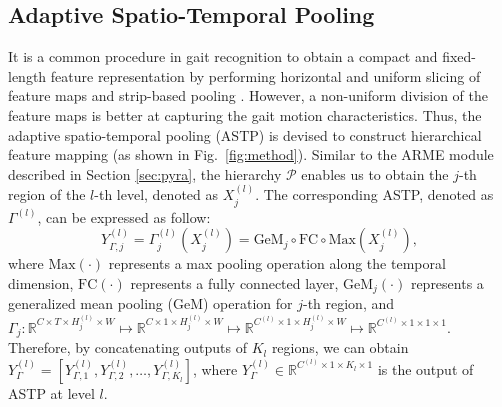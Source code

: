 \documentclass[10pt,twocolumn,letterpaper]{article}
\begin{document}
\subsection{Adaptive Spatio-Temporal  Pooling}
\label{sec:astp}

It is a common procedure in gait recognition to obtain a compact and fixed-length feature representation by performing horizontal and uniform slicing of feature maps and strip-based pooling \cite{chao2019gaitset,fu2019horizontal,lin2020gait,lin2021gait,huang2021context}. However, a non-uniform division of the feature maps is better at capturing the gait motion characteristics. Thus, the adaptive spatio-temporal pooling (ASTP) is devised to construct hierarchical feature mapping (as shown in Fig.~\ref{fig:method}). Similar to the ARME module described in Section \ref{sec:pyra}, the hierarchy $\mathcal{P}$ enables us to obtain the $j$-th region of the $l$-th level, denoted as $X_j^{(l)}$. The corresponding ASTP, denoted as $\Gamma^{(l)}$, can be expressed as follow:
\begin{equation}
Y_{\Gamma,j}^{(l)}=\Gamma_j^{(l)}(X_j^{(l)})=\text{GeM}_j \circ \text{FC} \circ \text{Max}(X_j^{(l)}),
\end{equation}
where $\text{Max}(\cdot)$ represents a max pooling operation along the temporal dimension, $\text{FC}(\cdot)$ represents a fully connected layer, $\text{GeM}_j(\cdot)$ represents a generalized mean pooling (GeM) operation \cite{radenovic2018fine} for $j$-th region, and $\Gamma_j:\mathbb{R}^{C \times T \times H_j^{(l)} \times W} \mapsto \mathbb{R}^{C \times 1 \times H_j^{(l)} \times W} \mapsto \mathbb{R}^{C^{(l)} \times 1 \times H_j^{(l)} \times W} \mapsto \mathbb{R}^{C^{(l)} \times 1 \times 1 \times 1}$. Therefore, by concatenating outputs of $K_l$ regions, we can obtain $Y_{\Gamma}^{(l)}=\left[Y_{\Gamma,1}^{(l)},Y_{\Gamma,2}^{(l)},\ldots,Y_{\Gamma,K_l}^{(l)}\right]$, where $Y_{\Gamma}^{(l)} \in \mathbb{R}^{C_{}^{(l)}\times 1 \times  K_l \times 1}$ is the output of ASTP at level $l$.
\end{document}
